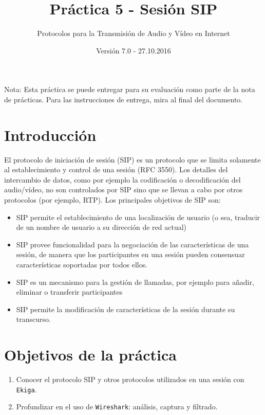 \documentclass[11pt,a4paper]{article}
\begin{document}
\title{Práctica 5 - Sesión SIP}
\author{Protocolos para la Transmisión de Audio y Vídeo en Internet}
\date{Versión 7.0 - 27.10.2016}


\maketitle

Nota: Esta práctica se puede entregar para su evaluación como parte de la nota de prácticas. Para las instrucciones de entrega, mira al final del documento. 

\section{Introducción}

El protocolo de iniciación de sesión (SIP) es un protocolo que se limita solamente al establecimiento y control de una sesión (RFC 3550). Los detalles del intercambio de datos, como por ejemplo la codificación o decodificación del audio/vídeo, no son controlados por SIP sino que se llevan a cabo por otros protocolos (por ejemplo, RTP). Los principales objetivos de SIP son:

\begin{itemize}
  \item SIP permite el establecimiento de una localización de usuario (o sea, traducir de un nombre de usuario a su dirección de red actual)
  \item SIP provee funcionalidad para la negociación de las características de una sesión, de manera que los participantes en una sesión pueden consensuar características soportadas por todos ellos.
  \item SIP es un mecanismo para la gestión de llamadas, por ejemplo para añadir, eliminar o transferir participantes
  \item SIP permite la modificación de características de la sesión durante su transcurso.
\end{itemize}

\section{Objetivos de la práctica}

\begin{enumerate}
  \item Conocer el protocolo SIP y otros protocolos utilizados en una sesión con \texttt{Ekiga}.
  \item Profundizar en el uso de \texttt{Wireshark}: análisis, captura y filtrado.
\end{enumerate}
\end{document}
